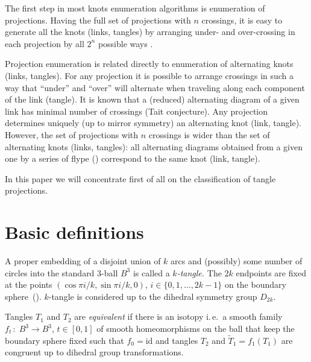 \documentclass[12pt]{article}
\begin{document}
The first step in most knots enumeration algorithms is enumeration of projections. Having the
full set of projections with $n$ crossings, it is easy to generate all the knots (links, tangles)
by arranging under- and over-crossing in each projection by all $2^n$ possible ways
\cite{Hoste2006}.

Projection enumeration is related directly to enumeration of alternating knots (links, tangles).
For any projection it is possible to arrange crossings in such a way that ``under'' and ``over''
will alternate when traveling along each component of the link (tangle). It is known that a
(reduced) alternating diagram of a given link has minimal number of crossings (Tait conjecture).
Any projection determines uniquely (up to mirror symmetry) an alternating knot (link, tangle).
However, the set of projections with $n$ crossings is wider than the set of alternating
knots (links, tangles): %
all alternating diagrams obtained from a given one by a series of flype ()
correspond to the same knot (link, tangle).


In this paper we will concentrate first of all on the classification of tangle projections.



\section{Basic definitions}\label{defs}

\begin{dfn} A proper embedding of a disjoint union of $k$ arcs and (possibly) some
number of circles into the standard $3$-ball $B^3$ is called a {\it $k$-tangle.} The $2k$
endpoints are fixed at the points $(\cos\pi i/k,\sin\pi i/k,0)$, $i\in\{0,1,\dots,2k{-}1\}$ on
the boundary sphere~(). $k$-tangle is considered up to the dihedral symmetry
group $D_{2k}$.\end{dfn}

\begin{dfn} Tangles $T_1$ and $T_2$ are {\it equivalent\/} if there is an isotopy i.\,e.~a
smooth family $f_t\,{:}\;B^3\to B^3$, $t\in[0,1]$ of smooth homeomorphisms on the ball that keep
the boundary sphere fixed such that $f_0=\mathrm{id}$ and tangles $T_2$ and $\tilde T_1=f_1(T_1)$
are congruent up to dihedral group transformations.\end{dfn}
\end{document}
